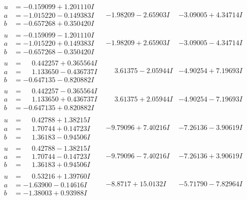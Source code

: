 \documentclass[1p]{elsarticle_modified}
\theoremstyle{definition}
\begin{document}
$$\begin{array}{c|c|c}
\begin{aligned}
u &= -0.159099 + 1.201110 I \\
a &= -1.015220 - 0.149383 I \\
b &= -0.657268 + 0.350420 I\end{aligned}
 & -1.98209 - 2.65903 I & -3.09005 + 4.34714 I \\ \hline\begin{aligned}
u &= -0.159099 - 1.201110 I \\
a &= -1.015220 + 0.149383 I \\
b &= -0.657268 - 0.350420 I\end{aligned}
 & -1.98209 + 2.65903 I & -3.09005 - 4.34714 I \\ \hline\begin{aligned}
u &= \phantom{-}0.442257 + 0.365564 I \\
a &= \phantom{-}1.133650 - 0.436737 I \\
b &= -0.647135 - 0.820882 I\end{aligned}
 & \phantom{-}3.61375 - 2.05944 I & -4.90254 + 7.19693 I \\ \hline\begin{aligned}
u &= \phantom{-}0.442257 - 0.365564 I \\
a &= \phantom{-}1.133650 + 0.436737 I \\
b &= -0.647135 + 0.820882 I\end{aligned}
 & \phantom{-}3.61375 + 2.05944 I & -4.90254 - 7.19693 I \\ \hline\begin{aligned}
u &= \phantom{-}0.42788 + 1.38215 I \\
a &= \phantom{-}1.70744 + 0.14723 I \\
b &= \phantom{-}1.36183 - 0.94506 I\end{aligned}
 & -9.79096 + 7.40216 I & -7.26136 - 3.90619 I \\ \hline\begin{aligned}
u &= \phantom{-}0.42788 - 1.38215 I \\
a &= \phantom{-}1.70744 - 0.14723 I \\
b &= \phantom{-}1.36183 + 0.94506 I\end{aligned}
 & -9.79096 - 7.40216 I & -7.26136 + 3.90619 I \\ \hline\begin{aligned}
u &= \phantom{-}0.53216 + 1.39760 I \\
a &= -1.63900 - 0.14616 I \\
b &= -1.38003 + 0.93988 I\end{aligned}
 & -8.8717 + 15.0132 I & -5.71790 - 7.82964 I \\ \hline\begin{aligned}

\end{aligned}
\end{array}$$
\end{document}
